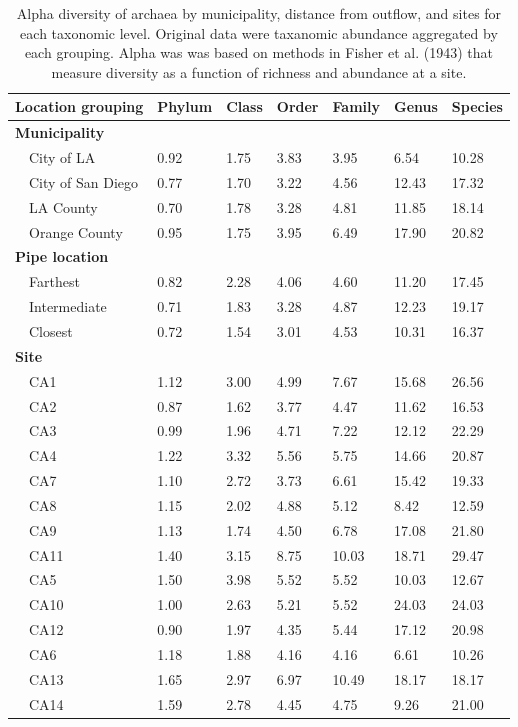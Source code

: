 \documentclass[letterpaper,12pt]{article}\usepackage[]{graphicx}\usepackage[]{color}
\begin{document}
\begin{table}[!tbp]
\caption{Alpha diversity of archaea by municipality, distance from outflow, and sites for each taxonomic level.  Original data were taxanomic abundance aggregated by each grouping.  Alpha was was based on methods in Fisher et al. (1943) that measure diversity as a function of richness and abundance at a site.\label{tab:alpha_arch}} 
\begin{center}
\begin{tabular}{lllllll}
\hline\hline
\multicolumn{1}{l}{Location grouping}&\multicolumn{1}{c}{Phylum}&\multicolumn{1}{c}{Class}&\multicolumn{1}{c}{Order}&\multicolumn{1}{c}{Family}&\multicolumn{1}{c}{Genus}&\multicolumn{1}{c}{Species}\tabularnewline
\hline
{\bfseries Municipality}&&&&&&\tabularnewline
~~City of LA&0.92&1.75&3.83& 3.95& 6.54&10.28\tabularnewline
~~City of San Diego&0.77&1.70&3.22& 4.56&12.43&17.32\tabularnewline
~~LA County&0.70&1.78&3.28& 4.81&11.85&18.14\tabularnewline
~~Orange County&0.95&1.75&3.95& 6.49&17.90&20.82\tabularnewline
\hline
{\bfseries Pipe location}&&&&&&\tabularnewline
~~Farthest&0.82&2.28&4.06& 4.60&11.20&17.45\tabularnewline
~~Intermediate&0.71&1.83&3.28& 4.87&12.23&19.17\tabularnewline
~~Closest&0.72&1.54&3.01& 4.53&10.31&16.37\tabularnewline
\hline
{\bfseries Site}&&&&&&\tabularnewline
~~CA1&1.12&3.00&4.99& 7.67&15.68&26.56\tabularnewline
~~CA2&0.87&1.62&3.77& 4.47&11.62&16.53\tabularnewline
~~CA3&0.99&1.96&4.71& 7.22&12.12&22.29\tabularnewline
~~CA4&1.22&3.32&5.56& 5.75&14.66&20.87\tabularnewline
~~CA7&1.10&2.72&3.73& 6.61&15.42&19.33\tabularnewline
~~CA8&1.15&2.02&4.88& 5.12& 8.42&12.59\tabularnewline
~~CA9&1.13&1.74&4.50& 6.78&17.08&21.80\tabularnewline
~~CA11&1.40&3.15&8.75&10.03&18.71&29.47\tabularnewline
~~CA5&1.50&3.98&5.52& 5.52&10.03&12.67\tabularnewline
~~CA10&1.00&2.63&5.21& 5.52&24.03&24.03\tabularnewline
~~CA12&0.90&1.97&4.35& 5.44&17.12&20.98\tabularnewline
~~CA6&1.18&1.88&4.16& 4.16& 6.61&10.26\tabularnewline
~~CA13&1.65&2.97&6.97&10.49&18.17&18.17\tabularnewline
~~CA14&1.59&2.78&4.45& 4.75& 9.26&21.00\tabularnewline
\hline
\end{tabular}\end{center}

\end{table}
\end{document}

